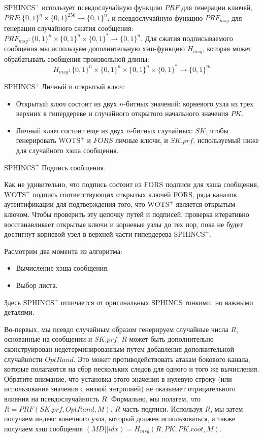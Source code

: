 \documentclass[a4paper, 14pt]{extarticle}
\begin{document}
$\text{SPHINCS}^{+}$ использует псевдослучайную функцию $PRF$ для генерации ключей, $PRF : \{0, 1\}^{n} \times \{0, 1\}^{256} \rightarrow \{0, 1\}^{n}$, и псевдослучайную функцию $PRF_{msg}$ для генерации случайного сжатия сообщения: $PRF_{msg} : \{0, 1\}^{n} \times \{0, 1\}^{n} \times \{0, 1\}^{*} \rightarrow \{0, 1\}^{n}$. Для сжатия подписываемого сообщения мы используем дополнительную хэш-функцию $H_{msg}$, которая может обрабатывать сообщения произвольной длины:
\[H_{msg} : \{0, 1\}^{n} \times \{0, 1\}^{n} \times \{0, 1\}^{n} \times \{0, 1\}^{*} \rightarrow \{0, 1\}^{m}\]

$\text{SPHINCS}^{+}$ Личный и открытый ключ:

\begin{itemize}
    \item Открытый ключ состоит из двух $n$-битных значений: корневого узла из трех верхних в гипердереве и случайного открытого начального значения $PK$.
    \item Личный ключ состоит еще из двух $n$-битных случайных: $SK$, чтобы генерировать $\text{WOTS}^{+}$ и $FORS$ личные ключи, и $SK.prf$, используемый ниже для случайного хэша сообщения.
\end{itemize}

$\text{SPHINCS}^{+}$ Подпись сообщения.

Как не удивительно, что подпись состоит из FORS подписи для хэша сообщения, $\text{WOTS}^{+}$ подпись соответствующих открытых ключей FORS, ряда каналов аутентификации для подтверждения того, что $\text{WOTS}^{+}$ является открытым ключом. Чтобы проверить эту цепочку путей и подписей, проверка итеративно восстанавливает открытые ключи и корневые узлы до тех пор, пока не будет достигнут корневой узел в верхней части гипердерева $\text{SPHINCS}^{+}$. 
\newline

Расмотрим два момента из алгоритма:

\begin{itemize}
    \item Вычисление хэша сообщения.
    \item Выбор листа.
\end{itemize}

Здесь $\text{SPHINCS}^{+}$ отличается от оригинальных SPHINCS тонкими, но важными деталями.

Во-первых, мы псевдо случайным образом генерируем случайные числа $R$, основанные на сообщении и $SK.prf$. $R$ может быть дополнительно сконструирован недетерминированным путем добавления дополнительной случайности $OptRand$. Это может противодействовать атакам бокового канала, которые полагаются на сбор нескольких следов для одного и того же вычисления. Обратите внимание, что установка этого значения в нулевую строку (или использование значения с низкой энтропией) не оказывает отрицательного влияния на псевдослучайность $R$. Формально, мы полагем, что $R = PRF(SK.prf, OptRand, M)$. $R$ часть подписи. Используя $R$, мы затем получаем индекс конечного узла, который должен использоваться, а также получаем хэш сообщения $(MD||idx) = H_{msg}(R, PK, PK.root, M)$.
\end{document}
